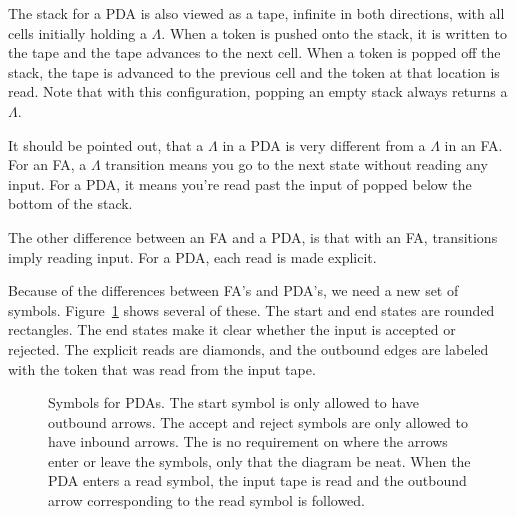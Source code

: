 \documentclass[letterpaper,12pt,openany,reqno]{book}%
\newcommand{\pdaterminal}[3] {\node at (#1) (#2) [rectangle, draw, rounded corners] {#3};}
\newcommand{\pdaread}[3] {\node at (#1) (#2) [diamond, draw] {#3}; }
\newcommand{\pdatransition}[3] {\draw [->] (#1) -- (#2) node [midway, above] {#3};}
\newcommand{\pdarighttransition}[3] {\draw [->] (#1) -- (#2) node [midway, right] {#3};}
\begin{document}
The stack for a PDA is also viewed as a tape, infinite in both directions, with all cells initially holding a $\Lambda$. When a token is pushed onto the stack, it is written to the tape and the tape advances to the next cell. When a token is popped off the stack, the tape is advanced to the previous cell and the token at that location is read. Note that with this configuration, popping an empty stack always returns a $\Lambda$.

It should be pointed out, that a $\Lambda$ in a PDA is very different from a $\Lambda$ in an FA. For an FA, a $\Lambda$ transition means you go to the next state without reading any input. For a PDA, it means you're read past the input of popped below the bottom of the stack.

The other difference between an FA and a PDA, is that with an FA, transitions imply reading input. For a PDA, each read is made explicit.

Because of the differences between FA's and PDA's, we need a new set of symbols. Figure~\ref{F.pda.symbols} shows several of these. The start and end states are rounded rectangles. The end states make it clear whether the input is accepted or rejected. The explicit reads are diamonds, and the outbound edges are labeled with the token that was read from the input tape.

\begin{figure}[hbt]
\centering
{}

\caption[Symbols for PDAs]{Symbols for PDAs. The start symbol is only allowed to have outbound arrows. The accept and reject symbols are only allowed to have inbound arrows. The is no requirement on where the arrows enter or leave the symbols, only that the diagram be neat. When the PDA enters a read symbol, the input tape is read and the outbound arrow corresponding to the read symbol is followed.}
\label{F.pda.symbols}
\end{figure}
\end{document}
